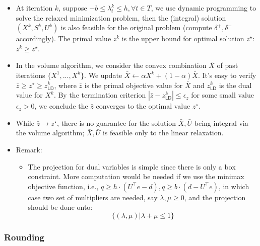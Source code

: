 \documentclass[
  a4paper,
,tablecaptionabove
]{scrartcl}
\numberwithin{equation}{section}
\providecommand{\tightlist}{%
  \setlength{\itemsep}{0pt}\setlength{\parskip}{0pt}}
\begin{document}
\begin{itemize}
  \item
        At iteration \(k\), suppose
        \(-b \le \lambda^k_t \le h, \forall t \in T\), we use dynamic
        programming to solve the relaxed minimization problem, then the
        (integral) solution \(( X^k, S^k, U^k)\) is also feasible for the
        original problem (compute \(\delta^+, \delta^-\) accordingly). The
        primal value \(z^k\) is the upper bound for optimal solution
        \(z^\star\): \(z^k\ge z^\star\).
  \item
        In the volume algorithm, we consider the convex combination \(\bar X\)
        of past iterations \(\{X^1, ..., X^k\}\). We update
        \(\bar X \leftarrow \alpha X^k + (1-\alpha) \bar X\). It's easy to
        verify \(\bar z \ge z^\star \ge z_{\textsf{LD}}^k\), where \(\bar z\)
        is the primal objective value for \(\bar X\) and \(z_{\textsf{LD}}^k\)
        is the dual value for \(X^k\). By the termination criterion
        \(|\bar z - z_{\textsf{LD}}^k| \le \epsilon_z\) for some small value
        \(\epsilon_z >0\), we conclude the \(\bar z\) converges to the optimal
        value \(z^\star\).
  \item
        While \(\bar z \to z^\star\), there is no guarantee for the solution
        \(\bar X, \bar U\) being integral via the volume algorithm;
        \(\bar X, \bar U\) is feasible only to the linear relaxation.
  \item
        Remark:

        \begin{itemize}
          \tightlist
          \item
                The projection for dual variables is simple since there is only a
                box constraint. More computation would be needed if we use the
                minimax objective function, i.e.,
                \(q \ge h\cdot (U^\top e - d), q\ge b\cdot (d-U^\top e)\), in which
                case two set of multipliers are needed, say \(\lambda, \mu \ge 0\),
                and the projection should be done onto:
                \[\{(\lambda,\mu)|\lambda +\mu \le 1\}\]
        \end{itemize}
\end{itemize}

\hypertarget{sec:rounding}{%
  \subsubsection{Rounding}\label{rounding}}
\end{document}
